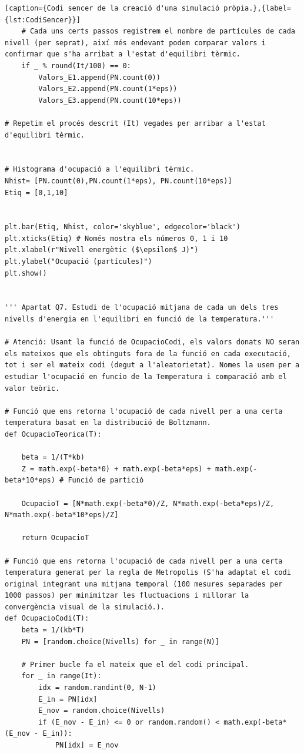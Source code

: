 \documentclass[a4paper,10.5pt]{report}
\begin{document}
\begin{appendices}
\begin{lstlisting}[caption={Codi sencer de la creació d'una simulació pròpia.},{label={lst:CodiSencer}}]
	# Cada uns certs passos registrem el nombre de partícules de cada nivell (per seprat), així més endevant podem comparar valors i confirmar que s'ha arribat a l'estat d'equilibri tèrmic. 
	if _ % round(It/100) == 0: 
		Valors_E1.append(PN.count(0)) 
		Valors_E2.append(PN.count(1*eps))
		Valors_E3.append(PN.count(10*eps))

# Repetim el procés descrit (It) vegades per arribar a l'estat d'equilibri tèrmic.


# Histograma d'ocupació a l'equilibri tèrmic.
Nhist= [PN.count(0),PN.count(1*eps), PN.count(10*eps)]
Etiq = [0,1,10]


plt.bar(Etiq, Nhist, color='skyblue', edgecolor='black')
plt.xticks(Etiq) # Només mostra els números 0, 1 i 10
plt.xlabel(r"Nivell energètic ($\epsilon$ J)")
plt.ylabel("Ocupació (partícules)")
plt.show()


''' Apartat Q7. Estudi de l'ocupació mitjana de cada un dels tres nivells d'energia en l'equilibri en funció de la temperatura.'''

# Atenció: Usant la funció de OcupacioCodi, els valors donats NO seran els mateixos que els obtinguts fora de la funció en cada executació, tot i ser el mateix codi (degut a l'aleatorietat). Nomes la usem per a estudiar l'ocupació en funcio de la Temperatura i comparació amb el valor teòric. 

# Funció que ens retorna l'ocupació de cada nivell per a una certa temperatura basat en la distribució de Boltzmann.
def OcupacioTeorica(T): 

	beta = 1/(T*kb)
	Z = math.exp(-beta*0) + math.exp(-beta*eps) + math.exp(-beta*10*eps) # Funció de partició 
	
	OcupacioT = [N*math.exp(-beta*0)/Z, N*math.exp(-beta*eps)/Z, N*math.exp(-beta*10*eps)/Z]
	
	return OcupacioT

# Funció que ens retorna l'ocupació de cada nivell per a una certa temperatura generat per la regla de Metropolis (S'ha adaptat el codi original integrant una mitjana temporal (100 mesures separades per 1000 passos) per minimitzar les fluctuacions i millorar la convergència visual de la simulació.). 
def OcupacioCodi(T):
	beta = 1/(kb*T)
	PN = [random.choice(Nivells) for _ in range(N)]
	
	# Primer bucle fa el mateix que el del codi principal. 
	for _ in range(It): 
		idx = random.randint(0, N-1)
		E_in = PN[idx]
		E_nov = random.choice(Nivells)
		if (E_nov - E_in) <= 0 or random.random() < math.exp(-beta*(E_nov - E_in)):
			PN[idx] = E_nov
	

\end{lstlisting}
\end{appendices}
\end{document}
